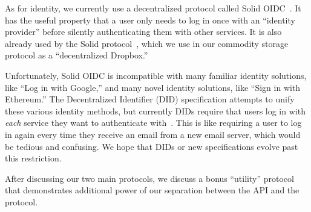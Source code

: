 As for identity, we currently use a decentralized protocol called Solid OIDC~\cite{solidoidc}.
It has the useful property that a user only needs to log in once
with an ``identity provider'' before silently authenticating
them with other services.
It is also already used by the Solid protocol~\cite{solid},
which we use in our commodity storage protocol as a ``decentralized Dropbox.''

Unfortunately, Solid OIDC is incompatible with many familiar
identity solutions, like ``Log in with Google,''
and many novel identity solutions, like ``Sign in with Ethereum.''
The Decentralized Identifier (DID) specification attempts to unify
these various identity methods, but currently DIDs require that
users log in with \emph{each} service they want to authenticate with~\cite{dids}.
This is like requiring a user to log in again every time
they receive an email from a new email server, which would
be tedious and confusing.
We hope that DIDs or new specifications evolve past this restriction.


After discussing our two main protocols, we discuss
a bonus ``utility'' protocol that demonstrates
additional power of our separation
between the API and the protocol.









